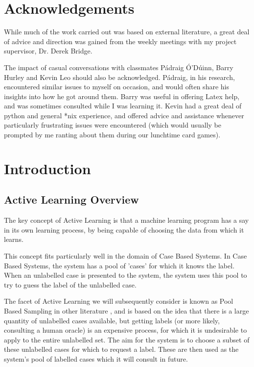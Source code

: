 \documentclass[a4paper,11pt]{report}
\begin{document}
\chapter*{Acknowledgements}
While much of the work carried out was based on external literature, a great deal of advice and direction was gained from the weekly meetings with my project supervisor, Dr. Derek Bridge.

The impact of casual conversations with classmates P\'{a}draig \'{O}'D\'{u}inn, Barry Hurley and Kevin Leo should also be acknowledged. P\'{a}draig, in his research, encountered similar issues to myself on occasion, and would often share his insights into how he got around them. Barry was useful in offering Latex help, and was sometimes consulted while I was learning it. Kevin had a great deal of python and general *nix experience, and offered advice and assistance whenever particularly frustrating issues were encountered (which would usually be prompted by me ranting about them during our lunchtime card games).

\tableofcontents

\chapter{Introduction}
\section{Active Learning Overview}
The key concept of Active Learning is that a machine learning program has a say in its own learning process, by being capable of choosing the data from which it learns. 

This concept fits particularly well in the domain of Case Based Systems. In Case Based Systems, the system has a pool of 'cases' for which it knows the label. When an unlabelled case is presented to the system, the system uses this pool to try to guess the label of the unlabelled case.

The facet of Active Learning we will subsequently consider is known as Pool Based Sampling in other literature \cite{Settles2010}, and is based on the idea that there is a large quantity of unlabelled cases available, but getting labels (or more likely, consulting a human oracle) is an expensive process, for which it is undesirable to apply to the entire unlabelled set. The aim for the system is to choose a subset of these unlabelled cases for which to request a label. These are then used as the system's pool of labelled cases which it will consult in future.
\end{document}
